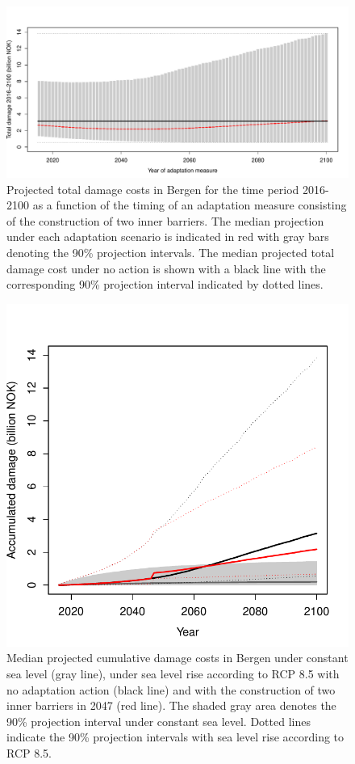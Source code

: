 \documentclass[draft,linenumbers]{agujournal}
\begin{document}
\begin{figure}[!hbpt]
\begin{center}
\includegraphics[width=\linewidth]{TotalDamageCostsAdaptation.pdf}
\caption{Projected total damage costs in Bergen for the time period 2016-2100 as a function of the timing of an adaptation measure consisting of the construction of two inner barriers. The median projection under each adaptation scenario is indicated in red with gray bars denoting the 90\% projection intervals. The median projected total damage cost under no action is shown with a black line with the corresponding 90\% projection interval indicated by dotted lines. }  
\label{fig:TotalDamageBergen}
\end{center}
\end{figure}

\begin{figure}[!hbpt]
\begin{center}
\includegraphics[width=0.5\linewidth]{CumDamageCostsBergen.pdf}
\caption{Median projected cumulative damage costs in Bergen under constant sea level (gray line), under sea level rise according to RCP 8.5 with no adaptation action (black line) and with the construction of two inner barriers in 2047 (red line). The shaded gray area denotes the 90\% projection interval under constant sea level. Dotted lines indicate the 90\% projection intervals with sea level rise according to RCP 8.5. }
\label{fig:NoAction}
\end{center}
\end{figure}
\end{document}
